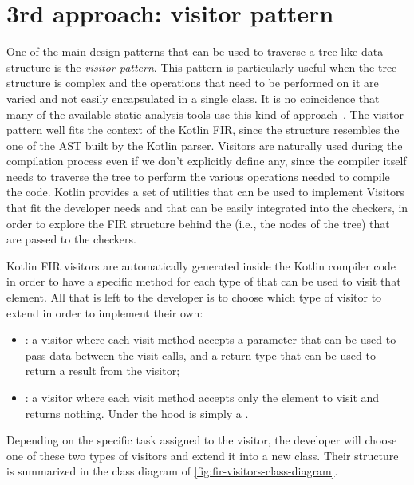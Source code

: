 \documentclass[12pt,a4paper,openright,twoside]{book}
\begin{document}
\section{3rd approach: visitor pattern}

One of the main design patterns that can be used to traverse a tree-like data
structure is the \emph{visitor pattern}. This pattern is particularly useful
when the tree structure is complex and the operations that need to be performed
on it are varied and not easily encapsulated in a single class. It is no
coincidence that many of the available static analysis tools use this kind of
approach~\cite{DBLP:journals/jss/LenarduzziPSLP23}.
%
The visitor pattern well fits the context of the Kotlin \ac{FIR}, since the
structure resembles the one of the \ac{AST} built by the Kotlin parser. 
Visitors are naturally used during the compilation process even if we don't
explicitly define any, since the compiler itself needs to traverse the tree to
perform the various operations needed to compile the code.
%
Kotlin provides a set of utilities that can be used to implement
Visitors that fit the developer needs and that can be easily integrated into the
checkers, in order to explore the \ac{FIR} structure behind the
 (i.e., the nodes of the tree) that are passed to the
checkers.

Kotlin \ac{FIR} visitors are automatically generated inside the Kotlin compiler 
code in order to have a specific method for each type of 
that can be used to visit that element. All that is left to the developer is to
choose which type of visitor to extend in order to implement their own:

\begin{itemize}
  \item {}: a visitor where each visit method accepts
a  parameter that can be used to pass data between the visit calls,
and a return type  that can be used to return a result from the 
visitor;
  \item {}: a visitor where each visit method accepts
only the element to visit and returns nothing. Under the hood is simply a 
.
\end{itemize}

Depending on the specific task assigned to the visitor, the developer will
choose one of these two types of visitors and extend it into a new class. Their
structure is summarized in the class diagram of
\cref{fig:fir-visitors-class-diagram}.
\end{document}
